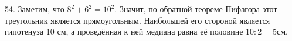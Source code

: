 54. Заметим, что $8^2+6^2=10^2.$ Значит, по обратной теореме Пифагора этот треугольник является прямоугольным. Наибольшей его стороной является гипотенуза 10 см, а проведённая к ней медиана равна её половине $10:2=5$см.\\
